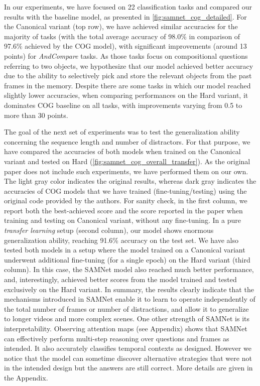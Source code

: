 In our experiments, we have focused on 22 classification tasks and compared our results with the baseline model, as presented in \cref{fig:samnet_cog_detailed}.
For the Canonical variant (top row), we have achieved similar accuracies for the majority of tasks (with the total average accuracy of 98.0\% in comparison of 97.6\% achieved by the COG model), with significant improvements (around 13 points) for \textit{AndCompare} tasks.
As those tasks focus on compositional questions referring to two objects, we hypothesize that our model achieved better accuracy due to the ability to selectively pick and store the relevant objects from the past frames in the memory.
Despite there are some tasks in which our model reached slightly lower accuracies,
when comparing performances on the Hard variant, it dominates COG baseline on all tasks, with improvements varying from 0.5 to more than 30 points.

The goal of the next set of experiments was to test the generalization ability concerning the sequence length and number of distractors.
For that purpose, we have compared the accuracies of both models when trained on the Canonical variant and tested on Hard (\cref{fig:samnet_cog_overall_transfer}).
As the original paper does not include such experiments, we have performed them on our own.  The light gray color indicates the original results, whereas dark gray indicates the accuracies of COG models that we have trained (fine-tuning/testing) using the original code provided by the authors.
For sanity check, in the first column, we report both the best-achieved score and the score reported in the paper when training and testing on Canonical variant, without any fine-tuning.
In a pure \textit{transfer learning} setup (second column), our model shows enormous generalization ability, reaching 91.6\% accuracy on the test set.
We have also tested both models in a setup where the model trained on a Canonical variant underwent additional fine-tuning (for a single epoch) on the Hard variant (third column).
In this case, the SAMNet model also reached much better performance, and, interestingly, achieved better scores from the model trained and tested exclusively on the Hard variant.
In summary, the results clearly indicate that the mechanisms introduced in SAMNet  enable it to learn to operate independently of the total number of frames or number of distractions, and allow it to generalize to longer videos and more complex scenes. One other strength of SAMNet is its interpretability. Observing attention maps (see Appendix) shows that SAMNet can effectively perform multi-step reasoning over questions and frames as intended. It also accurately classifies temporal contexts as designed. However we notice that the model can sometime discover alternative strategies that were not in the intended design but the answers are still correct. More details are given in the Appendix.

